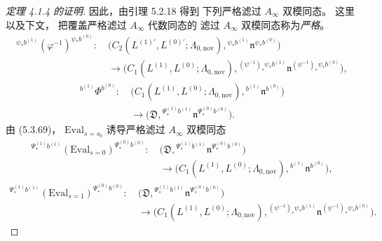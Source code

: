 \begin{proof}[定理 4.1.4 的证明]
因此，由引理 5.2.18 得到
下列严格滤过 $A_\infty$ 双模同态。
这里以及下文，
把覆盖严格滤过 $A_\infty$ 代数同态的
滤过 $A_\infty$ 双模同态称为\emph{严格}。
\begin{equation}
\begin{aligned}
{}^{\psi_*b^{(1)}}
(\varphi^{-1})^{\psi_*b^{(0)}}\colon\
&\bigl(
C_2(L^{(1)\prime},L^{(0)\prime};
\Lambda_{0,\mathrm{nov}}),
{}^{\psi_*b^{(1)}}\mathfrak n^{\psi_*b^{(0)}}
\bigr)\\
&\longrightarrow
\bigl(
C_1(L^{(1)},L^{(0)};
\Lambda_{0,\mathrm{nov}}),
{}^{(\psi^{-1})_*\psi_*b^{(1)}}
\mathfrak n^{(\psi^{-1})_*\psi_*b^{(0)}}
\bigr),
\end{aligned}
\tag{5.3.70}\label{eq:5-3-70}
\end{equation}
\begin{equation}
\begin{aligned}
{}^{b^{(1)}}\Phi^{b^{(0)}}\colon\
&\bigl(
C_1(L^{(1)},L^{(0)};
\Lambda_{0,\mathrm{nov}}),
{}^{b^{(1)}}\mathfrak n^{b^{(0)}}
\bigr)\\
&\longrightarrow
\bigl(
\mathfrak D,
{}^{\Psi_*^{(1)}b^{(1)}}
\mathfrak n^{\Psi_*^{(0)}b^{(0)}}
\bigr).
\end{aligned}
\tag{5.3.71}\label{eq:5-3-71}
\end{equation}
由 (5.3.69)，
$\mathrm{Eval}_{s=s_0}$
诱导严格滤过 $A_\infty$ 双模同态
\begin{equation}
\begin{aligned}
{}^{\Psi_*^{(1)}b^{(1)}}
(\mathrm{Eval}_{s=0})^{\Psi_*^{(0)}b^{(0)}}
\colon\
&\bigl(
\mathfrak D,
{}^{\Psi_*^{(1)}b^{(1)}}
\mathfrak n^{\Psi_*^{(0)}b^{(0)}}
\bigr)\\
&\longrightarrow
\bigl(
C_1(L^{(1)},L^{(0)};
\Lambda_{0,\mathrm{nov}}),
{}^{b^{(1)}}\mathfrak n^{b^{(0)}}
\bigr),
\end{aligned}
\tag{5.3.72}\label{eq:5-3-72}
\end{equation}
\begin{equation}
\begin{aligned}
{}^{\Psi_*^{(1)}b^{(1)}}
(\mathrm{Eval}_{s=1})^{\Psi_*^{(0)}b^{(0)}}
\colon\
&\bigl(
\mathfrak D,
{}^{\Psi_*^{(1)}b^{(1)}}
\mathfrak n^{\Psi_*^{(0)}b^{(0)}}
\bigr)\\
&\longrightarrow
\bigl(
C_1(L^{(1)},L^{(0)};
\Lambda_{0,\mathrm{nov}}),
{}^{(\psi^{-1})_*\psi_*b^{(1)}}
\mathfrak n^{(\psi^{-1})_*\psi_*b^{(0)}}
\bigr).
\end{aligned}
\tag{5.3.73}\label{eq:5-3-73}
\end{equation}


\end{proof}
